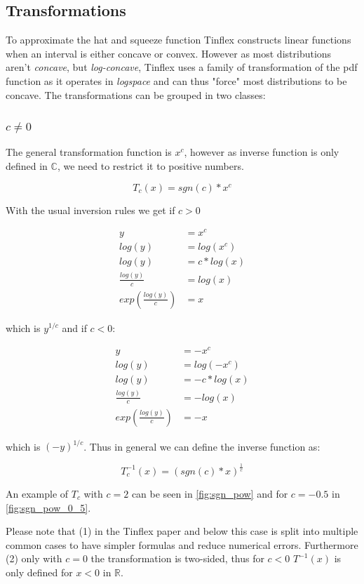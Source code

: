 \subsection{Transformations}

To approximate the hat and squeeze function Tinflex constructs linear functions when an interval is either concave or convex.
However as most distributions aren't \textit{concave}, but \textit{log-concave}, Tinflex uses a family of transformation of the pdf function as it operates in \textit{logspace} and can thus "force" most distributions to be concave. The transformations can be grouped in two classes:

\subsubsection{$c \neq 0$}

The general transformation function is $x^c$, however as inverse function is only defined in $\mathbb{C}$, we need to restrict it to positive numbers.

\[T_c(x) = sgn(c) * x^c\]

With the usual inversion rules we get if $c > 0$

\begin{align*}
y &= x^c \\
log(y) &= log(x^c) \\
log(y) &= c * log(x) \\
\frac{log(y)}{c} &= log(x) \\
exp\left(\frac{log(y)}{c}\right) &= x
\end{align*}

which is $y^{1 / c}$ and if $c < 0$:

\begin{align*}
y &= -x^c \\
log(y) &= log(-x^c) \\
log(y) &= -c * log(x) \\
\frac{log(y)}{c} &= -log(x) \\
exp\left(\frac{log(y)}{c}\right) &= -x
\end{align*}

which is $(-y)^{1 / c}$.
Thus in general we can define the inverse function as:

\[T_c^{-1}(x) = (sgn(c) * x)^{\frac{1}{c}}\]

An example of $T_c$ with $c = 2$ can be seen in \autoref{fig:sgn_pow} and for $c = -0.5$ in \autoref{fig:sgn_pow_0_5}.

Please note that (1) in the Tinflex paper and below this case is split into multiple common cases to have simpler formulas and reduce numerical errors. Furthermore (2) only with $c = 0$ the transformation is two-sided, thus for $c < 0$ $T^{-1}(x)$ is only defined for $x < 0$ in $\mathbb{R}$.

